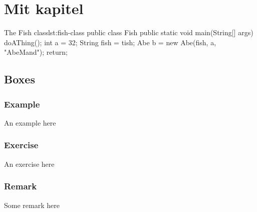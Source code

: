 \chapter{Mit kapitel}
\blindtext
{}



\begin{JavaCode}{The Fish class}{lst:fish-class}
	public class Fish {
		public static void main(String[] args) {
			doAThing();
			int a = 32;
			String fish = tish;
			Abe b = new Abe(fish, a, "AbeMand");
			return;
		}
	}
\end{JavaCode}

\blindtext

\section{Boxes}

\subsection{Example}
\begin{example}
	An example here
\end{example}

\subsection{Exercise}
\begin{exercise}
	An exercise here
\end{exercise}

\subsection{Remark}
\begin{remark}
	Some remark here
\end{remark}